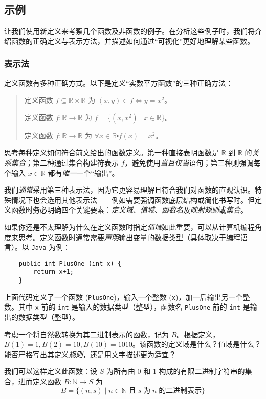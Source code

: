 
\subsection{示例}

让我们使用新定义来考察几个函数及非函数的例子。在分析这些例子时，我们将介绍函数的正确定义与表示方法，并描述如何通过``可视化''更好地理解某些函数。

\subsubsection*{表示法}

定义函数有多种正确方式。以下是定义``实数平方函数''的三种正确方法：
\begin{quotation}
    定义函数 $f \subseteq \mathbb{R} \times \mathbb{R}$ 为 $(x, y) \in f \iff y = x^2$。

    定义函数 $f : \mathbb{R} \to \mathbb{R}$ 为 $f=\big\{(x,x^2) \mid x \in \mathbb{R}\big\}$。

    定义函数 $f : \mathbb{R} \to \mathbb{R}$ 为 $\forall x \in \mathbb{R} \centerdot f(x) = x^2$。
\end{quotation}

思考每种定义如何符合前文给出的函数定义。第一种直接表明函数是 $\mathbb{R}$ 到 $\mathbb{R}$ 的\emph{关系集合}；第二种通过集合构建符表示 $f$，避免使用\emph{当且仅当}语句；第三种则强调每个输入 $x \in \mathbb{R}$ 都有\emph{唯一}一个``输出''。

我们\emph{通常}采用第三种表示法，因为它更容易理解且符合我们对函数的直观认识。特殊情况下也会选用其他表示法——例如需要强调函数底层结构或简化书写时。但定义函数时务必明确四个关键要素：\emph{定义域}、\emph{值域}、\emph{函数名}及\emph{映射规则}或\emph{集合}。

如果你还是不太理解为什么在定义函数时指定\emph{值域}如此重要，可以从计算机编程角度来思考。定义函数时通常需要\emph{声明}输出变量的数据类型（具体取决于编程语言）。以 \verb|Java| 为例：
\begin{verbatim}
    public int PlusOne (int x) {
        return x+1;
    }
\end{verbatim}
上面代码定义了一个函数 (\verb|PlusOne|)，输入一个整数 (\verb|x|)，加一后输出另一个整数。其中 \verb|x| 前的 \verb|int| 是输入的数据类型（整型），函数名 \verb|PlusOne| 前的 \verb|int| 是输出的数据类型（整型）。

\begin{example}
    考虑一个将自然数转换为其二进制表示的函数，记为 $B$。根据定义，$B(1) = 1, B(2) = 10, B(10) = 1010$。该函数的定义域是什么？值域是什么？能否严格写出其定义\emph{规则}，还是用文字描述更为适宜？

    我们可以这样定义此函数：设 $S$ 为所有由 $0$ 和 $1$ 构成的有限二进制字符串的集合，进而定义函数 $B : \mathbb{N} \to S$ 为
    \[B = \{(n, s) \mid n \in \mathbb{N} \;\text{且}\; s \;\text{为}\; n \;\text{的二进制表示}\}\]
\end{example}

